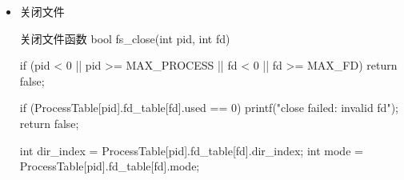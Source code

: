 \begin{itemize}
\begin{ccode}{打开文件函数}
{    //分配fd
    for (int fd = 0; fd < MAX_FD; fd++) {
        if (ProcessTable[pid].fd_table[fd].used == 0) {
            ProcessTable[pid].fd_table[fd].used = 1;
            ProcessTable[pid].fd_table[fd].dir_index = dir_index;
            ProcessTable[pid].fd_table[fd].offset = 0;
            ProcessTable[pid].fd_table[fd].mode = mode;

            printf("open success: pid=%
                   pid, filename, fd);
            return fd;
        }
    }

    //fd分配失败,回退已经做的修改
    if (mode == MODE_READ) {
        pthread_mutex_lock(&Directory[dir_index].mutex);
        Directory[dir_index].reader_count--;
        if (Directory[dir_index].reader_count == 0) {
            sem_post(&Directory[dir_index].rw_lock);  // 最后一个读者释放文件 
        }
        pthread_mutex_unlock(&Directory[dir_index].mutex);
    } else {
        sem_post(&Directory[dir_index].rw_lock);  // 写者释放文件 
    }

    printf("open failed: fd table full\n");
    return -1;
}
    \end{ccode}
    整体实现思路类似任务一,在Directory数组中查找要打开的文件时前后加锁保护,确保一致性。之后按读者-写者问题的经典解法实现:
    当以只读模式(MODE\_READ)打开时,该进程视为读者,需要先互斥修改reader\_count(通过pthread\_mutex\_lock/unlock对mutex加锁/解锁),若为第一个读者,还需对资源信号量执行P操作(sem\_trywait(\&Directory[dir\_index].rw\_lock)),以阻塞后续写者;
    当以只写模式(MODE\_WRITE)或读写模式(MODE\_RDWR)打开时,该进程视为写者,直接对资源信号量执行P操作,确保对文件的互斥访问,阻止其他读者和写者。
    这里实现时使用\texttt{sem\_trywait}而非\texttt{sem\_wait},原因是若使用sem\_wait阻塞等待,当前交互界面会被卡住,无法手动切换进程并释放资源。因此本实验采用非阻塞方式,即文件被占用时直接返回失败。在实际多进程环境中应当使用真正的阻塞等待来实现互斥。
    对于打开的文件需要分配文件描述符fd,当fd表已满时意味着文件打开失败,此时需要回退前一步做的修改,即恢复reader\_count以及释放资源信号量(sem\_post)。
    \item 关闭文件
    \begin{ccode}{关闭文件函数}
bool fs_close(int pid, int fd)
{
    if (pid < 0 || pid >= MAX_PROCESS || fd < 0 || fd >= MAX_FD) {
        return false;
    }

    if (ProcessTable[pid].fd_table[fd].used == 0) {
        printf("close failed: invalid fd\n");
        return false;
    }

    int dir_index = ProcessTable[pid].fd_table[fd].dir_index;
    int mode = ProcessTable[pid].fd_table[fd].mode;


}
\end{ccode}
\end{itemize}
